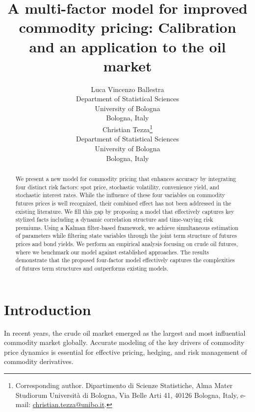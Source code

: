 \documentclass{article}
\title{A multi-factor model for improved commodity pricing: Calibration and an application to the oil market}
\author{ Luca Vincenzo Ballestra\\
	Department of Statistical Sciences \\
	University of Bologna \\ Bologna, Italy \\
       \And
       Christian Tezza\thanks{
   Corresponding author. Dipartimento di Scienze Statistiche, Alma Mater Studiorum Università di Bologna, Via Belle Arti 41, 40126 Bologna, Italy, e-mail: \href{mailto:christian.tezza@unibo.it}{christian.tezza@unibo.it}.}\\
  Department of Statistical Sciences \\
	University of Bologna \\ Bologna, Italy \\
}
\begin{document}
\maketitle

\begin{abstract}

We present a new model for commodity pricing that enhances accuracy by integrating four distinct risk factors:  spot price, stochastic volatility, convenience yield, and stochastic interest rates. While the influence of these four variables on commodity futures prices is well recognized, their combined effect has not been addressed in the existing literature. We fill this gap by proposing a model that effectively captures key stylized facts including a dynamic correlation structure and time-varying risk premiums. Using a Kalman filter-based framework, we achieve simultaneous estimation of parameters while filtering state variables through the joint term structure of futures prices and bond yields. We perform an empirical analysis focusing on crude oil futures, where we benchmark our model against established approaches. The results demonstrate that the proposed four-factor model effectively captures the complexities of futures term structures and outperforms existing models.

\end{abstract}




\section{Introduction}



In recent years, the crude oil market emerged as the largest and most influential commodity market globally. Accurate modeling of the key drivers of commodity price dynamics is essential for effective pricing, hedging, and risk management of commodity derivatives.




\end{document}
